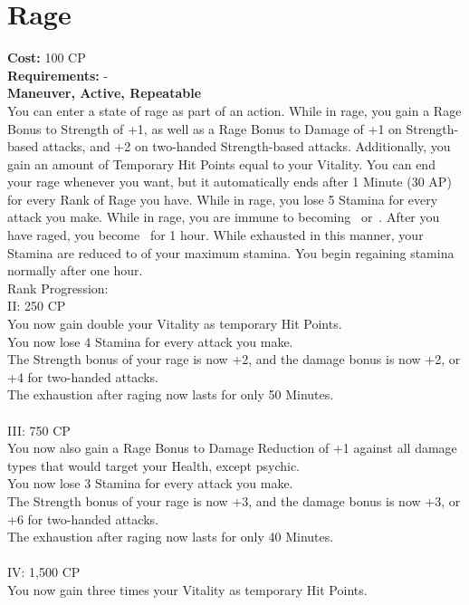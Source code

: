 \section{Rage}\label{perk:rage}
\textbf{Cost:} 100 CP\\
\textbf{Requirements:} -\\
\textbf{Maneuver, Active, Repeatable}\\
You can enter a state of rage as part of an action.
While in rage, you gain a Rage Bonus to Strength of +1, as well as a Rage Bonus to Damage of +1 on Strength-based attacks, and +2 on two-handed Strength-based attacks.
Additionally, you gain an amount of Temporary Hit Points equal to your Vitality.
You can end your rage whenever you want, but it automatically ends after 1 Minute (30 AP) for every Rank of Rage you have.
While in rage, you lose 5 Stamina for every attack you make.
While in rage, you are immune to becoming~ or~.
After you have raged, you become~ for 1 hour.
While exhausted in this manner, your Stamina are reduced to  of your maximum stamina.
You begin regaining stamina normally after one hour.
\\
Rank Progression:\\
II: 250 CP\\
You now gain double your Vitality as temporary Hit Points.\\
You now lose 4 Stamina for every attack you make.\\
The Strength bonus of your rage is now +2, and the damage bonus is now +2, or +4 for two-handed attacks.\\
The exhaustion after raging now lasts for only 50 Minutes.\\
\\
III: 750 CP\\
You now also gain a Rage Bonus to Damage Reduction of +1 against all damage types that would target your Health, except psychic.\\
You now lose 3 Stamina for every attack you make.\\
The Strength bonus of your rage is now +3, and the damage bonus is now +3, or +6 for two-handed attacks.\\
The exhaustion after raging now lasts for only 40 Minutes.\\
\\
IV: 1,500 CP\\
You now gain three times your Vitality as temporary Hit Points.\\
